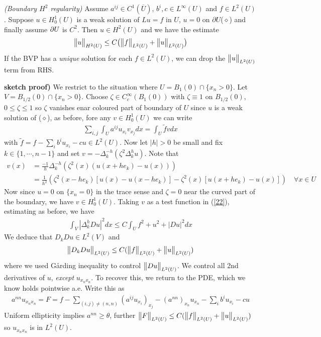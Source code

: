 \documentclass[12pt,a4paper]{report}
\newenvironment{proof}
{\begin{changemargin}{1cm}{0.5cm} 
	}%
	{\end{changemargin}
}
\begin{document}
\thm \emph{(Boundary $H^2$ regularity)} Assume $a^{ij}\in C^1(\overline{U})$, $b^i,c\in L^{\infty}(U)$ and $f\in L^2(U)$. Suppose $u\in H_0^1(U)$ is a weak solution of $Lu =f$ in $U$, $u=0$ on $\partial U$($\diamond$) and finally assume $\partial U$ is $C^2$. Then $u\in H^2(U)$ and we have the estimate
\begin{align*}
\bigl\lVert u\bigr\rVert_{H^2(U)} \leq C \big( \bigl\lVert f\bigr\rVert_{L^2(U)} + \bigl\lVert u\bigr\rVert_{L^2(U)} \big)
\end{align*}
If the BVP has a \emph{unique} solution for each $f\in L^2(U)$, we can drop the $\bigl\lVert u\bigr\rVert_{L^2(U)}$ term from RHS.
\begin{proof}
\textbf{sketch proof)} We restrict to the situation where $U = B_1(0) \cap \{ x_n >0 \}$. Let $V= B_{1/2}(0) \cap \{x_n >0 \}$. Choose $\zeta \in C_c^{\infty}(B_1(0))$ with $\zeta \equiv 1$ on $B_{1/2}(0)$, $0\leq \zeta \leq 1$ so $\zeta$ vanishes enar coloured part of boundary of $U$ since $u$ is a weak solution of ($\diamond$), as before, fore any $v\in H_0^1(U)$ we can write
\begin{align}
\sum_{i,j} \int_U a^{ij}u_{x_i}v_{x_j} dx = \int_U \tilde{f}vdx \label{22}
\end{align}
with $\tilde{f} = f- \sum_i b^i u_{x_i} -cu \in L^2(U)$. Now let $|h|>0$ be small and fix $k\in \{1,\cdots, n-1\}$ and set $v= -\Delta_k^{-h} (\zeta^2 \Delta_k^h u)$. Note that
\begin{align*}
v(x) &= \frac{-1}{h} \Delta^{-h}_k (\zeta^2 (x) (u(x+ he_k) - u(x))) \\
&= \frac{1}{h^2} (\zeta^2 (x-he_k)[u(x) - u(x-he_k)] - \zeta^2(x)[u(x+he_k)-u(x)]) \quad \forall x\in U
\end{align*}
Now since $u=0$ on $\{x_n =0\}$ in the trace sense and $\zeta =0$ near the curved part of the boundary, we have $v\in H_0^1(U)$. Taking $v$ as a test function in (\ref{22}), estimating as before, we have
\begin{align*}
\int_V |\Delta_k^h Du|^2 dx \leq C \int_U f^2 + u^2 + |Du|^2 dx
\end{align*}
We deduce that $D_k Du \in L^2(V)$ and
\begin{align*}
\bigl\lVert D_k Du \bigr\rVert_{L^2(U)} \leq C(\bigl\lVert f\bigr\rVert_{L^2(U)} + \bigl\lVert u\bigr\rVert_{L^2(U)})
\end{align*}
where we used G{\aa}rding inequality to control $\bigl\lVert Du\bigr\rVert_{L^2(U)}$. We control all 2nd derivatives of $u$, \emph{except} $u_{x_n x_n}$. To recover this, we return to the PDE, which we know holds pointwise a.e. Write this as
\begin{align*}
a^{nn}u_{x_n x_n} = F = f- \sum_{(i,j) \neq (n,n)} (a^{ij}u_{x_i})_{x_j} - (a^{nn})_{x_n} u_{x_n} - \sum_{i} b^i u_{x_i} -cu
\end{align*}
Uniform ellipticity implies $a^{nn} \geq \theta$, further $\bigl\lVert F\bigr\rVert_{L^2(U)} \leq C( \bigl\lVert f\bigr\rVert_{L^2(U)} + \bigl\lVert u\bigr\rVert_{L^2(U)})$ so $u_{x_n x_n}$ is in $L^2(U)$.

\eop
\end{proof}
\s
\end{document}
